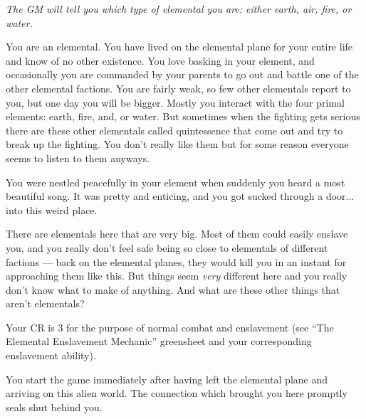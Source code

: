 \documentclass[char]{elementals}
\begin{document}
\name{\cNewElemental{}}

\emph{The GM will tell you which type of elemental you are: either earth, air, fire, or water.}

You are an elemental. You have lived on the elemental plane for your entire life and know of no other existence. You love basking in your element, and occasionally you are commanded by your parents to go out and battle one of the other elemental factions. You are fairly weak, so few other elementals report to you, but one day you will be bigger. Mostly you interact with the four primal elements: earth, fire, and, or water. But sometimes when the fighting gets serious there are these other elementals called quintessence that come out and try to break up the fighting. You don't really like them but for some reason everyone seems to listen to them anyways.

You were nestled peacefully in your element when suddenly you heard a most beautiful song.  It was pretty and enticing, and you got sucked through a door... into this weird place.

There are elementals here that are very big. Most of them could easily enslave you, and you really don't feel safe being so close to elementals of different factions --- back on the elemental planes, they would kill you in an instant for approaching them like this. But things seem \emph{very} different here and you really don't know what to make of anything. And what are these other things that aren't elementals?

Your CR is 3 for the purpose of normal combat and enslavement (see ``The Elemental Enslavement Mechanic'' greensheet and your corresponding enslavement ability).

You start the game immediately after having left the elemental plane and arriving on this alien world. The connection which brought you here promptly seals shut behind you.
\end{document}
